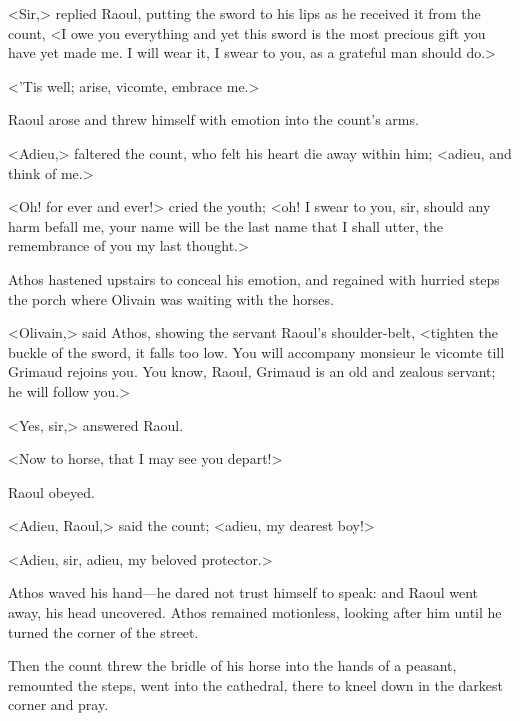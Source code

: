 <Sir,> replied Raoul, putting the sword to his lips as he received it from the count, <I owe you everything and yet this sword is the most precious gift you have yet made me. I will wear it, I swear to you, as a grateful man should do.>

<'Tis well; arise, vicomte, embrace me.>

Raoul arose and threw himself with emotion into the count's arms.

<Adieu,> faltered the count, who felt his heart die away within him; <adieu, and think of me.>

<Oh! for ever and ever!> cried the youth; <oh! I swear to you, sir, should any harm befall me, your name will be the last name that I shall utter, the remembrance of you my last thought.>

Athos hastened upstairs to conceal his emotion, and regained with hurried steps the porch where Olivain was waiting with the horses.

<Olivain,> said Athos, showing the servant Raoul's shoulder-belt, <tighten the buckle of the sword, it falls too low. You will accompany monsieur le vicomte till Grimaud rejoins you. You know, Raoul, Grimaud is an old and zealous servant; he will follow you.>

<Yes, sir,> answered Raoul.

<Now to horse, that I may see you depart!>

Raoul obeyed.

<Adieu, Raoul,> said the count; <adieu, my dearest boy!>

<Adieu, sir, adieu, my beloved protector.>

Athos waved his hand—he dared not trust himself to speak: and Raoul went away, his head uncovered. Athos remained motionless, looking after him until he turned the corner of the street.

Then the count threw the bridle of his horse into the hands of a peasant, remounted the steps, went into the cathedral, there to kneel down in the darkest corner and pray. 